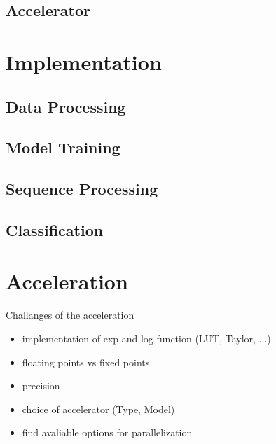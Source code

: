 \documentclass[mscthesis]{usiinfthesis}
\begin{document}
\section{Accelerator}

\chapter{Implementation}
\section{Data Processing}
\section{Model Training}
\section{Sequence Processing}
\section{Classification}

\chapter{Acceleration}
Challanges of the acceleration
\begin{itemize}
    \item implementation of exp and log function (LUT, Taylor, ...)
    \item floating points vs fixed points
    \item precision
    \item choice of accelerator (Type, Model)
    \item find avaliable options for parallelization
\end{itemize}
\end{document}
